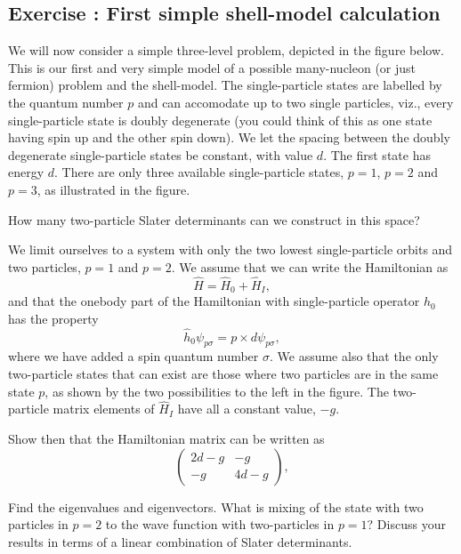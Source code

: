 \documentclass[graybox,sectrefs,envcountresetchap,open=right]{svmonodo}
\newenvironment{doconceexercise}{}{}
\newcounter{doconceexercisecounter}
\begin{document}
\begin{doconceexercise}

\subsection*{Exercise \thedoconceexercisecounter: First simple shell-model calculation}


We will now consider a simple three-level problem, depicted in the figure below. This is our first and very simple model of a possible many-nucleon (or just fermion) problem and the shell-model.
The single-particle states are labelled by the quantum number $p$ and can accomodate up to two single particles,  viz., every single-particle state  is doubly degenerate (you could think of this as one state having spin up and the other spin down). 
We let the spacing between the doubly degenerate single-particle states be constant, with value $d$.  The first state
has energy $d$. There are only three available single-particle states, $p=1$, $p=2$ and $p=3$, as illustrated
in the figure.


How many two-particle Slater determinants can we construct in this space? 

We limit ourselves to a system with only the two lowest single-particle orbits and two particles, $p=1$ and $p=2$. We assume that we can write the Hamiltonian as
\[
       \hat{H}=\hat{H}_0+\hat{H}_I,
\]
and that the onebody part of the Hamiltonian with single-particle operator $\hat{h}_0$ has the property
\[
\hat{h}_0\psi_{p\sigma} = p\times d \psi_{p\sigma},
\]
where we have added a spin quantum number $\sigma$. 
We assume also that the only two-particle states that can exist are those where two particles are in the 
same state $p$, as shown by the two possibilities to the left in the figure.
The two-particle matrix elements of $\hat{H}_I$ have all a constant value, $-g$.

Show then that the Hamiltonian matrix can be written as 
\[
\left(\begin{array}{cc}2d-g &-g \\
-g &4d-g \end{array}\right),
\]

Find the eigenvalues and eigenvectors.  What is mixing of the state with two particles in $p=2$  to the wave function with two-particles in $p=1$? Discuss your results in terms of a linear combination of Slater determinants.


\end{doconceexercise}
\end{document}
